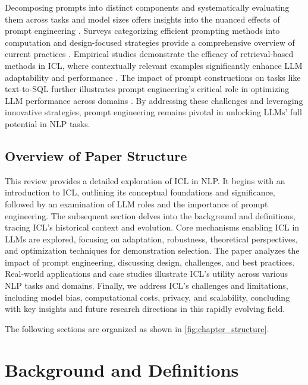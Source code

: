 Decomposing prompts into distinct components and systematically evaluating them across tasks and model sizes offers insights into the nuanced effects of prompt engineering \cite{shivagunde2024deconstructingincontextlearningunderstanding}. Surveys categorizing efficient prompting methods into computation and design-focused strategies provide a comprehensive overview of current practices \cite{chang2024efficientpromptingmethodslarge}. Empirical studies demonstrate the efficacy of retrieval-based methods in ICL, where contextually relevant examples significantly enhance LLM adaptability and performance \cite{luo2024incontextlearningretrieveddemonstrations}. The impact of prompt constructions on tasks like text-to-SQL further illustrates prompt engineering's critical role in optimizing LLM performance across domains \cite{chang2023promptllmstexttosqlstudy}. By addressing these challenges and leveraging innovative strategies, prompt engineering remains pivotal in unlocking LLMs' full potential in NLP tasks.

\subsection{Overview of Paper Structure} \label{subsec:Overview of Paper Structure}

This review provides a detailed exploration of ICL in NLP. It begins with an introduction to ICL, outlining its conceptual foundations and significance, followed by an examination of LLM roles and the importance of prompt engineering. The subsequent section delves into the background and definitions, tracing ICL's historical context and evolution. Core mechanisms enabling ICL in LLMs are explored, focusing on adaptation, robustness, theoretical perspectives, and optimization techniques for demonstration selection. The paper analyzes the impact of prompt engineering, discussing design, challenges, and best practices. Real-world applications and case studies illustrate ICL's utility across various NLP tasks and domains. Finally, we address ICL's challenges and limitations, including model bias, computational costs, privacy, and scalability, concluding with key insights and future research directions in this rapidly evolving field.


The following sections are organized as shown in \autoref{fig:chapter_structure}.







\section{Background and Definitions} \label{sec:Background and Definitions}

